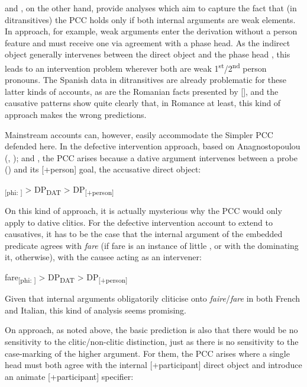 \documentclass[output=paper,colorlinks,citecolor=brown,nonflat]{langsci/langscibook}
\begin{document}
\citet{Bianchi2006} and \citet{Stegovec2017}, on the other hand, provide analyses which aim to capture the fact that (in ditransitives) the PCC holds only if both internal arguments are weak elements. In  approach, for example, weak arguments enter the derivation without a person feature and must receive one via agreement with a phase head. As the indirect object generally intervenes between the direct object and the phase head \liv , this leads to an intervention problem wherever both are weak 1\textsuperscript{st}/2\textsuperscript{nd} person pronouns. The Spanish data in ditransitives are already problematic for these latter kinds of accounts, as are the Romanian facts presented by  [], and the causative patterns show quite clearly that, in Romance at least, this kind of approach makes the wrong predictions.

Mainstream accounts can, however, easily accommodate the Simpler PCC defended here. In the defective intervention approach, based on Anagnostopoulou (\citeyear{Anagnostopoulou2003}, \citeyear{Anagnostopoulou2005}); \citet{BéjarRezac2003} and \citet{Rezac2008}, the PCC arises because a dative argument intervenes between a probe (\liv ) and its [+person] goal, the accusative direct object:

\ea%
    \label{ex:sheehan:37}
    \liv \textsubscript{[phi: ]}    > DP\textsubscript{DAT} >     DP\textsubscript{[+person]}
\z

On this kind of approach, it is actually mysterious why the PCC would only apply to dative clitics. For the defective intervention account to extend to causatives, it has to be the case that the internal argument of the embedded predicate agrees with \textit{fare} (if fare is an instance of little \liv , or with the \liv dominating it, otherwise), with the causee acting as an intervener:

\ea%
    \label{ex:sheehan:38}
    fare\textsubscript{[phi: ]}   >  DP\textsubscript{DAT} >   DP\textsubscript{[+person]}
\z

Given that internal arguments obligatorily cliticise onto \textit{faire}/\textit{fare} in both French and Italian, this kind of analysis seems promising.

On  approach, as noted above, the basic prediction is also that there would be no sensitivity to the clitic/non-clitic distinction, just as there is no sensitivity to the case-marking of the higher argument. For them, the PCC arises where a single head must both agree with the internal [+participant] direct object and introduce an animate [+participant] specifier:
\end{document}
